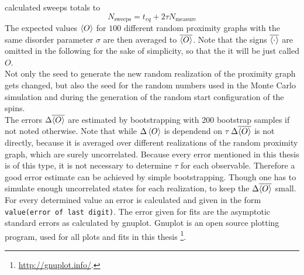     calculated sweeps totals to
    \[N_{\mathrm{sweeps}}=t_{eq}+2\tau N_{\mathrm{measure}}\]
    The expected values \(\left< O \right>\) for \(100\) different random proximity
    graphs with the same disorder parameter \(\sigma\) are then averaged to
    \(\overline{\left< O \right>}\). Note that the signs \(\overline{\left< \cdot \right>}\)
    are omitted in the following for the sake of simplicity, so that the
    it will be just called \(O\).\\
    Not only the seed to generate the new random
    realization of the proximity graph gets changed, but also the seed for
    the random numbers used in the Monte Carlo simulation and during the
    generation of the random start configuration of the spins.\\
    The errors \(\Delta \overline{\left< O \right>}\) are estimated by bootstrapping
    \cite{Bootstrap} with 200 bootstrap samples if not noted otherwise.
    Note that while \(\Delta \left< O \right>\) is dependend on \(\tau\) \cite[p. 151]{Katzgraber2011}
    \(\Delta \overline{\left< O \right>}\) is not directly, because it is averaged
    over different realizations of the random proximity graph, which are
    surely uncorrelated.
    Because every error mentioned in this thesis is of this type, it is not
    necessary to determine \(\tau\) for each observable. Therefore a good
    error estimate can be achieved by simple bootstrapping. Though one has
    to simulate enough uncorrelated states for each realization, to keep
    the \(\Delta \overline{\left< O \right>}\) small. For every determined value an
    error is calculated and given in the form \texttt{value(error of last digit)}.
    The error given for fits are the asymptotic standard errors as calculated
    by gnuplot. Gnuplot is an open source plotting program, used for all plots
    and fits in this thesis \footnote{\url{http://gnuplot.info/}.}.

